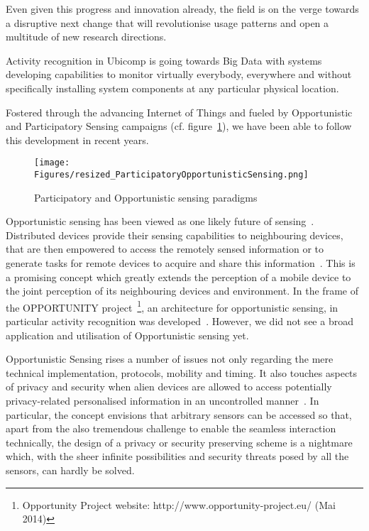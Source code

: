 \documentclass[journal]{IEEEtran}
\begin{document}
Even given this progress and innovation already, the field is on the verge towards a disruptive next change that will revolutionise usage patterns and open a multitude of new research directions.

Activity recognition in Ubicomp is going towards Big Data with systems developing capabilities to monitor virtually everybody, everywhere and without specifically installing system components at any particular physical location.

Fostered through the advancing Internet of Things and fueled by Opportunistic and Participatory Sensing campaigns (cf. figure~\ref{figureParticipatoryOpportunisticSensing}), we have been able to follow this development in recent years.
\begin{figure}
 \centering
 \texttt{[image: Figures/resized\_ParticipatoryOpportunisticSensing.png]}
 \caption{Participatory and Opportunistic sensing paradigms}
 \label{figureParticipatoryOpportunisticSensing}
\end{figure}

Opportunistic sensing has been viewed as one likely future of sensing~\cite{Opportunistic_Campbell_2008}.
Distributed devices provide their sensing capabilities to neighbouring devices, that are then empowered to access the remotely sensed information or to generate tasks for remote devices to acquire and share this information~\cite{OpportunisticSensing_Lane_2008,OpportunisticSensing_Kapadia_2008}.
This is a promising concept which greatly extends the perception of a mobile device to the joint perception of its neighbouring devices and environment.
In the frame of the OPPORTUNITY project~\footnote{Opportunity Project website: http://www.opportunity-project.eu/ (Mai 2014)}, an architecture for opportunistic sensing, in particular activity recognition was developed~\cite{OpportunisticSensing_Roggen_2009,OpportunisticSensing_Kurz_2011}.
However, we did not see a broad application and utilisation of Opportunistic sensing yet.

Opportunistic Sensing rises a number of issues not only regarding the mere technical implementation, protocols, mobility and timing.
It also touches aspects of privacy and security when alien devices are allowed to access potentially privacy-related personalised information in an uncontrolled manner~\cite{OpportunisticSensing_Kapadia_2008,OpportunisticSensing_Shin_2011}.
In particular, the concept envisions that arbitrary sensors can be accessed so that, apart from the also tremendous challenge to enable the seamless interaction technically, the design of a privacy or security preserving scheme is a nightmare which, with the sheer infinite possibilities and security threats posed by all the sensors, can hardly be solved.
\end{document}
